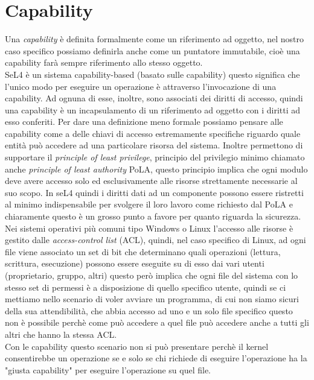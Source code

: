 \section{Capability}
Una \textit{capability} è definita formalmente come un riferimento ad oggetto, nel nostro caso specifico possiamo definirla anche come un puntatore immutabile, cioè una capability farà sempre riferimento allo stesso oggetto.\\
SeL4 è un sistema capability-based (basato sulle capability) 
questo significa che l'unico modo per eseguire un operazione è attraverso l'invocazione di una capability. Ad ognuna di esse, inoltre, sono associati dei diritti di accesso, quindi una capability è un incapsulamento di un riferimento ad oggetto con i diritti ad esso conferiti.
Per dare una definizione meno formale possiamo pensare alle capability come a delle chiavi di accesso estremamente specifiche riguardo quale entità può accedere ad una particolare risorsa del sistema. Inoltre permettono di supportare il \textit{principle of least privilege}, principio del privilegio minimo chiamato anche \textit{principle of least authority} PoLA, questo principio implica che ogni modulo deve avere accesso solo ed esclusivamente alle risorse strettamente necessarie al suo scopo.
In seL4 quindi i diritti dati ad un componente possono essere ristretti al minimo indispensabile per svolgere il loro lavoro come richiesto dal PoLA e chiaramente questo è un grosso punto a favore per quanto riguarda la sicurezza.\\
Nei sistemi operativi più comuni tipo Windows o Linux l'accesso alle risorse è gestito dalle \textit{access-control list} (ACL), quindi, nel caso specifico di Linux, ad ogni file viene associato un set di bit che determinano quali operazioni (lettura, scrittura, esecuzione) possono essere eseguite su di esso dai vari utenti (proprietario, gruppo, altri) questo però implica che ogni file del sistema con lo stesso set di permessi è a disposizione di quello specifico utente, quindi se ci mettiamo nello scenario di voler avviare un programma, di cui non siamo sicuri della sua attendibilità, che abbia accesso ad uno e un solo file specifico questo non è possibile perchè come può accedere a quel file può accedere anche a tutti gli altri che hanno la stessa ACL.\\
Con le capability questo scenario non si può presentare perchè il kernel consentirebbe un operazione se e solo se chi richiede di eseguire l'operazione ha la "giusta capability" per eseguire l'operazione su quel file. 

